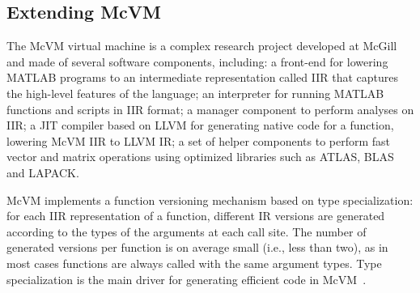 \subsection{Extending McVM}
The McVM virtual machine is a complex research project developed at McGill and made of several software components, including: a front-end for lowering MATLAB programs to an intermediate representation called IIR that captures the high-level features of the language; an interpreter for running MATLAB functions and scripts in IIR format; a manager component to perform analyses on IIR; a JIT compiler based on LLVM for generating native code for a function, lowering McVM IIR to LLVM IR; a set of helper components to perform fast vector and matrix operations using optimized libraries such as ATLAS, BLAS and LAPACK. %

McVM implements a function versioning mechanism based on type specialization: for each IIR representation of a function, different IR versions are generated according to the types of the arguments at each call site. The number of generated versions per function is on average small (i.e., less than two), as in most cases functions are always called with the same argument types. Type specialization is the main driver for generating efficient code in McVM~\cite{chevalier2010mcvm}.

